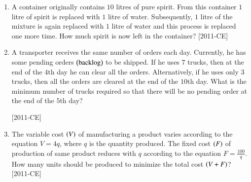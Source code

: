\documentclass[journal]{IEEEtran}
\begin{document}
\begin{enumerate}[start=53]
\begin{enumerate}
\end{enumerate}
\item A container originally contains $10$ litres of pure spirit. From this container $1$ litre of spirit is replaced with $1$ litre of water. Subsequently, $1$ litre of the mixture is again replaced with $1$ litre of water and this process is replaced one more time. How much spirit is now left in the container? \hfill{[2011-CE]}
\begin{enumerate}
\end{enumerate}
\item A transporter receives the same number of orders each day. Currently, he has some pending orders $\left(\text{backlog}\right)$ to be shipped. If he uses $7$ trucks, then at the end of the $4$th day he can clear all the orders. Alternatively, if he uses only $3$ trucks, then all the orders are cleared at the end of the $10$th day. What is the minimum number of trucks required so that there will be no pending order at the end of the $5$th day? 

    \hfill{[2011-CE]}
\begin{enumerate}
\end{enumerate}
\item The variable cost $\left(V\right)$ of manufacturing a product varies according to the equation $V=4q$, where $q$ is the quantity produced. The fixed cost $\left(F\right)$ of production of same product reduces with $q$ according to the equation $F=\frac{100}{q}$. How many units should be produced to minimize the total cost $\left(V+F\right)$? \hfill{[2011-CE]}
\begin{enumerate}
\end{enumerate}
\end{enumerate}
\end{document}
